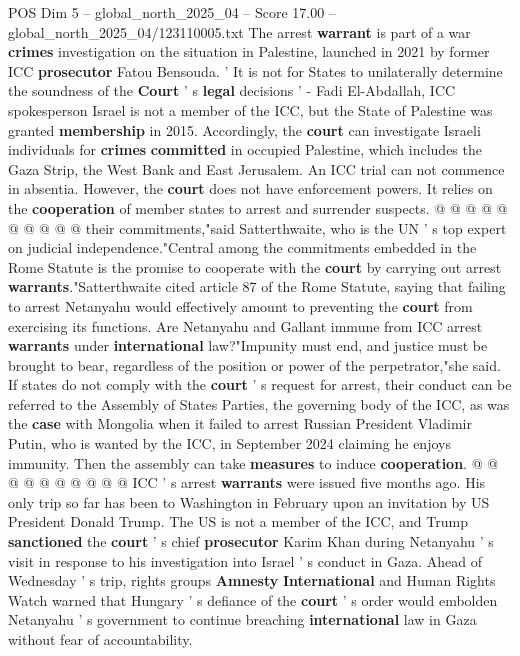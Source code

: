 \begin{textsample}{POS Dim 5 – global\_north\_2025\_04 – Score 17.00 – global\_north\_2025\_04/123110005.txt}
The arrest \textbf{warrant} is part of a war \textbf{crimes} investigation on the situation in Palestine, launched in 2021 by former ICC \textbf{prosecutor} Fatou Bensouda. ' It is not for States to unilaterally determine the soundness of the \textbf{Court} ' s \textbf{legal} decisions ' - Fadi El-Abdallah, ICC spokesperson Israel is not a member of the ICC, but the State of Palestine was granted \textbf{membership} in 2015.
Accordingly, the \textbf{court} can investigate Israeli individuals for \textbf{crimes} \textbf{committed} in occupied Palestine, which includes the Gaza Strip, the West Bank and East Jerusalem.
An ICC trial can not commence in absentia.
However, the \textbf{court} does not have enforcement powers.
It relies on the \textbf{cooperation} of member states to arrest and surrender suspects. @ @ @ @ @ @ @ @ @ @ their commitments,"said Satterthwaite, who is the UN ' s top expert on judicial independence."Central among the commitments embedded in the Rome Statute is the promise to cooperate with the \textbf{court} by carrying out arrest \textbf{warrants}."Satterthwaite cited article 87 of the Rome Statute, saying that failing to arrest Netanyahu would effectively amount to preventing the \textbf{court} from exercising its functions.
Are Netanyahu and Gallant immune from ICC arrest \textbf{warrants} under \textbf{international} law?"Impunity must end, and justice must be brought to bear, regardless of the position or power of the perpetrator,"she said.
If states do not comply with the \textbf{court} ' s request for arrest, their conduct can be referred to the Assembly of States Parties, the governing body of the ICC, as was the \textbf{case} with Mongolia when it failed to arrest Russian President Vladimir Putin, who is wanted by the ICC, in September 2024 claiming he enjoys immunity.
Then the assembly can take \textbf{measures} to induce \textbf{cooperation}. @ @ @ @ @ @ @ @ @ @ ICC ' s arrest \textbf{warrants} were issued five months ago.
His only trip so far has been to Washington in February upon an invitation by US President Donald Trump.
The US is not a member of the ICC, and Trump \textbf{sanctioned} the \textbf{court} ' s chief \textbf{prosecutor} Karim Khan during Netanyahu ' s visit in response to his investigation into Israel ' s conduct in Gaza.
Ahead of Wednesday ' s trip, rights groups \textbf{Amnesty} \textbf{International} and Human Rights Watch warned that Hungary ' s defiance of the \textbf{court} ' s order would embolden Netanyahu ' s government to continue breaching \textbf{international} law in Gaza without fear of accountability.

\end{textsample}
